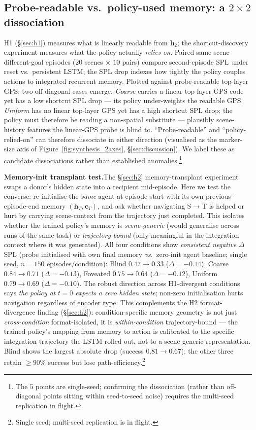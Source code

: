 \documentclass{article}
\newcommand{\uncertain}[1]{{\color{uncertaincol}#1}}
\newcommand{\pendnote}[1]{\footnote{\color{uncertaincol}\small #1}}
\begin{document}
\subsection{Probe-readable vs.\ policy-used memory: a $2{\times}2$ dissociation}
\label{sec:dissociation}

H1 (§\ref{sec:h1}) measures what is linearly readable from $\mathbf{h}_2$; the shortcut-discovery experiment measures what the policy actually \emph{relies on}. Paired same-scene-different-goal episodes ($20$ scenes $\times$ $10$ pairs) compare second-episode SPL under reset vs.\ persistent LSTM; the SPL drop indexes how tightly the policy couples actions to integrated recurrent memory. Plotted against probe-readable top-layer GPS, two off-diagonal cases emerge. \emph{Coarse} carries a linear top-layer GPS code yet has a low shortcut SPL drop --- its policy under-weights the readable GPS. \emph{Uniform} has no linear top-layer GPS yet has a high shortcut SPL drop; \uncertain{the policy must therefore be reading a non-spatial substitute --- plausibly scene-history features the linear-GPS probe is blind to.} ``Probe-readable'' and ``policy-relied-on'' can therefore dissociate in either direction (visualised as the marker-size axis of Figure~\ref{fig:synthesis_2axes}, §\ref{sec:discussion}). We label these as candidate dissociations rather than established anomalies.\pendnote{The 5 points are single-seed; confirming the dissociation (rather than off-diagonal points sitting within seed-to-seed noise) requires the multi-seed replication in flight.}

\noindent\textbf{Memory-init transplant test.}\quad The §\ref{sec:h2} memory-transplant experiment swaps a donor's hidden state into a recipient mid-episode. Here we test the converse: re-initialise the \emph{same} agent at episode start with its own previous-episode-end memory $(\mathbf{h}_T, \mathbf{c}_T)$, and ask whether navigating S$\to$T is helped or hurt by carrying scene-context from the trajectory just completed. This isolates whether the trained policy's memory is \emph{scene-generic} (would generalise across runs of the same task) or \emph{trajectory-bound} (only meaningful in the integration context where it was generated). All four conditions show \emph{consistent negative} $\Delta$SPL (probe initialised with own final memory \emph{vs.\ }zero-init agent baseline; single seed, $n{=}150$ episodes/condition): Blind $0.47 \to 0.33$ ($\Delta=-0.14$), Coarse $0.84 \to 0.71$ ($\Delta=-0.13$), Foveated $0.75 \to 0.64$ ($\Delta=-0.12$), Uniform $0.79 \to 0.69$ ($\Delta=-0.10$). The robust direction across H1-divergent conditions says \emph{the policy at $t{=}0$ expects a zero hidden state}; non-zero initialisation hurts navigation regardless of encoder type. This complements the H2 format-divergence finding (§\ref{sec:h2}): condition-specific memory geometry is not just \emph{cross-condition} format-isolated, it is \emph{within-condition} trajectory-bound — the trained policy's mapping from memory to action is calibrated to the specific integration trajectory the LSTM rolled out, not to a scene-generic representation. Blind shows the largest absolute drop (success $0.81 \to 0.67$); the other three retain $\geq 90$\% success but lose path-efficiency.\pendnote{Single seed; multi-seed replication is in flight.}
\end{document}
